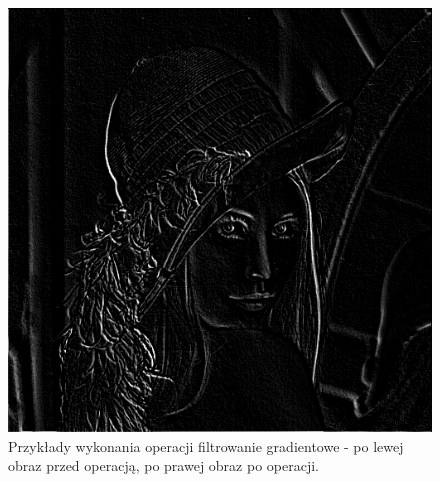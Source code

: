 \documentclass{article}
\begin{document}
\begin{figure}[!htb]
\includegraphics[scale=0.2]{img/_Filtr_Gradientowy_lena_8bit.png} 
\caption{Przykłady wykonania operacji filtrowanie gradientowe - po lewej obraz przed operacją, po prawej obraz po operacji. }
\end{figure}
\end{document}
